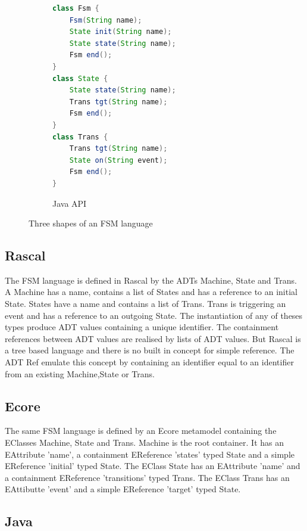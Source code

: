 \begin{figure}[bt]
	\enskip
	\vrule
	\begin{subfigure}[b]{.35\columnwidth}
		\begin{lstlisting}[label=lst:fsm-api, language=Java, numbers=none, xleftmargin=0pt, tabsize=1]
class Fsm {
	Fsm(String name);
	State init(String name);
	State state(String name);
	Fsm end();
}
class State {
	State state(String name);
	Trans tgt(String name);
	Fsm end();
}
class Trans {
	Trans tgt(String name);
	State on(String event);
	Fsm end();
}
		\end{lstlisting}
		\caption{Java API}
	\end{subfigure}
	\caption{Three shapes of an FSM language}
\end{figure}

\subsection{Rascal}

The FSM language is defined in Rascal by the ADTs Machine, State and Trans.
A Machine has a name, contains a list of States and has a reference to an initial State.
States have a name and contains a list of Trans.
Trans is triggering an event and has a reference to an outgoing State.
The instantiation of any of theses types produce ADT values containing a unique identifier.
The containment references between ADT values are realised by lists of ADT values. But Rascal is a tree based language and there is no built in concept for simple reference.
The ADT Ref emulate this concept by containing an identifier equal to an identifier from an existing Machine,State or Trans.

\subsection{Ecore}

The same FSM language is defined by an Ecore metamodel containing the EClasses Machine, State and Trans.
Machine is the root container. It has an EAttribute ’name’, a containment EReference ’states’ typed State and a simple EReference ’initial’ typed State.
The EClass State has an EAttribute ’name’ and a containment EReference ’transitions’ typed Trans.
The EClass Trans has an EAttibutte ’event’ and a simple EReference ’target’ typed State.

\subsection{Java}

